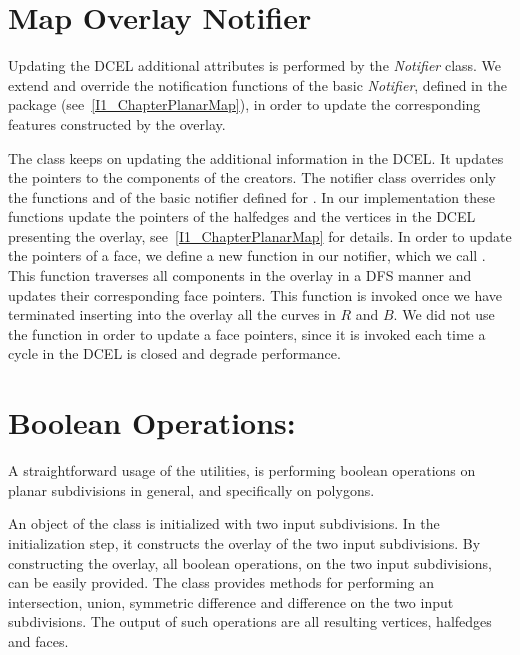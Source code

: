 \section{Map Overlay Notifier}
\label{sec:notifier}
Updating the DCEL additional attributes is performed by the
{\em Notifier} class.
We extend and override the notification functions of the basic {\em Notifier}, 
defined in the  package 
(see~\ref{I1_ChapterPlanarMap}), 
in order to update the corresponding features constructed by the overlay. 

The  class 
keeps on updating the additional information in the DCEL.
It updates the pointers to the components of the creators.
The notifier class overrides only the functions  
and  of the basic notifier defined for .
In our implementation these functions update 
the pointers of the halfedges and the vertices in the DCEL 
presenting the overlay, see~\ref{I1_ChapterPlanarMap} for details.
In order to update the pointers of a face, we define a new function in our 
notifier, which we call . 
This function traverses all components in the overlay in a DFS manner and 
updates their corresponding face pointers. 
This function is invoked once we have terminated 
inserting into the overlay all the curves in $R$ and $B$.
We did not use the  function in order to update a 
face pointers, since it is invoked each time a cycle in the DCEL 
is closed and degrade performance. 

\section{Boolean Operations:}
A straightforward usage of the  
utilities, is performing boolean operations on planar subdivisions in general, 
and specifically on polygons.

An object of the  class is initialized with 
two input subdivisions. In the initialization step, it constructs the overlay 
of the two input subdivisions. By constructing the overlay, all boolean operations, 
on the two input subdivisions, can be easily provided.
The   class provides methods for 
performing an intersection, union, symmetric difference and difference on the two 
input subdivisions. 
The output of such operations are all resulting vertices, halfedges and faces.

